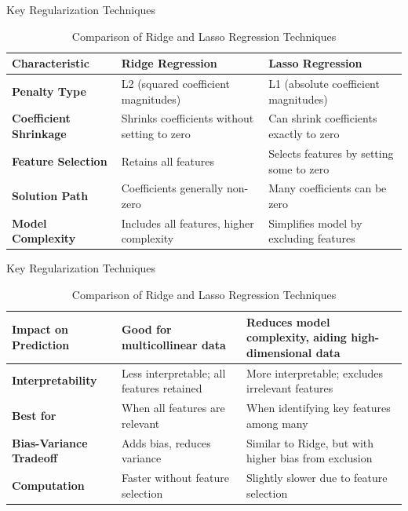 \documentclass[serif, aspectratio=169]{beamer}
\begin{document}
\begin{frame}{Key Regularization Techniques}
\begin{table}[]
    \centering
    \begin{tabular}{|p{4cm}|p{4cm}|p{4cm}|}
        \hline
        \textbf{Characteristic} & \textbf{Ridge Regression} & \textbf{Lasso Regression} \\ \hline
        \textbf{Penalty Type} & L2 (squared coefficient magnitudes) & L1 (absolute coefficient magnitudes) \\ \hline
        \textbf{Coefficient Shrinkage} & Shrinks coefficients without setting to zero & Can shrink coefficients exactly to zero \\ \hline
        \textbf{Feature Selection} & Retains all features & Selects features by setting some to zero \\ \hline
        \textbf{Solution Path} & Coefficients generally non-zero & Many coefficients can be zero \\ \hline
        \textbf{Model Complexity} & Includes all features, higher complexity & Simplifies model by excluding features \\ \hline
    \end{tabular}
    \caption{Comparison of Ridge and Lasso Regression Techniques}
    \label{tab:ridge_vs_lasso}
\end{table}
\end{frame}

\begin{frame}{Key Regularization Techniques}
\begin{table}[]
    \centering
    \begin{tabular}{|p{4cm}|p{4cm}|p{4cm}|}
        \hline
        \textbf{Impact on Prediction} & Good for multicollinear data & Reduces model complexity, aiding high-dimensional data \\ \hline
        \textbf{Interpretability} & Less interpretable; all features retained & More interpretable; excludes irrelevant features \\ \hline
        \textbf{Best for} & When all features are relevant & When identifying key features among many \\ \hline
        \textbf{Bias-Variance Tradeoff} & Adds bias, reduces variance & Similar to Ridge, but with higher bias from exclusion \\ \hline
        \textbf{Computation} & Faster without feature selection & Slightly slower due to feature selection \\ \hline
    \end{tabular}
    \caption{Comparison of Ridge and Lasso Regression Techniques}
    \label{tab:ridge_vs_lasso}
\end{table}
\end{frame}
\end{document}
